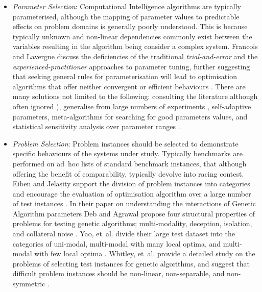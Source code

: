 \begin{itemize}
	\item \emph{Parameter Selection}: Computational Intelligence algorithms are typically parameterised, although the mapping of parameter values to predictable effects on problem domains is generally poorly understood. This is because typically unknown and non-linear dependencies commonly exist between the variables resulting in the algorithm being consider a complex system. Francois and Lavergne discuss the deficiencies of the traditional \emph{trial-and-error} and the \emph{experienced-practitioner} approaches to parameter tuning, further suggesting that seeking general rules for parameterisation will lead to optimisation algorithms that offer neither convergent or efficient behaviours \cite{Francois2001}. There are many solutions not limited to the following: consulting the literature although often ignored \cite{Eiben2002}), generalise from large numbers of experiments \cite{Schaffer1989}, self-adaptive parameters, meta-algorithms for searching for good parameters values, and statistical sensitivity analysis over parameter ranges \cite{Chan1997, Birattari2002}. 
	
	\item \emph{Problem Selection}: Problem instances should be selected to demonstrate specific behaviours of the systems under study. Typically benchmarks are performed on ad~hoc lists of standard benchmark instances, that although offering the benefit of comparability, typically devolve into racing contest. Eiben and Jelasity support the division of problem instances into categories and encourage the evaluation of optimisation algorithm over a large number of test instances \cite{Eiben2002}. In their paper on understanding the interactions of Genetic Algorithm parameters Deb and Agrawal propose four structural properties of problems for testing genetic algorithms; multi-modality, deception, isolation, and collateral noise \cite{Deb1999}. Yao, et~al.  divide their large test dataset into the categories of uni-modal, multi-modal with many local optima, and multi-modal with few local optima \cite{Yao1999}. Whitley, et~al.  provide a detailed study on the problems of selecting test instances for genetic algorithms, and suggest that difficult problem instances should be non-linear, non-separable, and non-symmetric \cite{Whitley1996}.
	

\end{itemize}

